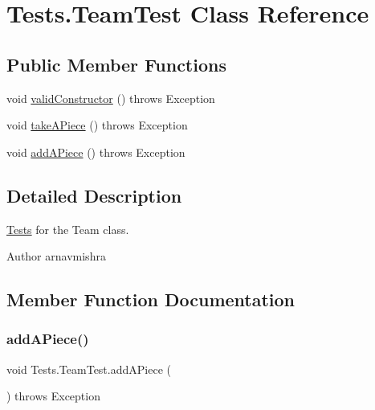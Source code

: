 \hypertarget{class_tests_1_1_team_test}{}\section{Tests.\+Team\+Test Class Reference}
\label{class_tests_1_1_team_test}
\subsection*{Public Member Functions}
\begin{DoxyCompactItemize}
\item 
void \hyperlink{class_tests_1_1_team_test_a2e81c6940e0a7ed7ec9f05ea4d0799d7}{valid\+Constructor} ()  throws Exception 
\item 
void \hyperlink{class_tests_1_1_team_test_a7cb853699e49ed8f2cb52056fba9be1e}{take\+A\+Piece} ()  throws Exception 
\item 
void \hyperlink{class_tests_1_1_team_test_a7a58d153f2570b724ee30b0281387739}{add\+A\+Piece} ()  throws Exception 
\end{DoxyCompactItemize}


\subsection{Detailed Description}
\hyperlink{namespace_tests}{Tests} for the Team class. \begin{DoxyAuthor}{Author}
arnavmishra 
\end{DoxyAuthor}


\subsection{Member Function Documentation}
\hypertarget{class_tests_1_1_team_test_a7a58d153f2570b724ee30b0281387739}{}\label{class_tests_1_1_team_test_a7a58d153f2570b724ee30b0281387739} 
\subsubsection{\texorpdfstring{add\+A\+Piece()}{addAPiece()}}
{\footnotesize\ttfamily void Tests.\+Team\+Test.\+add\+A\+Piece (\begin{DoxyParamCaption}{ }\end{DoxyParamCaption}) throws Exception}

